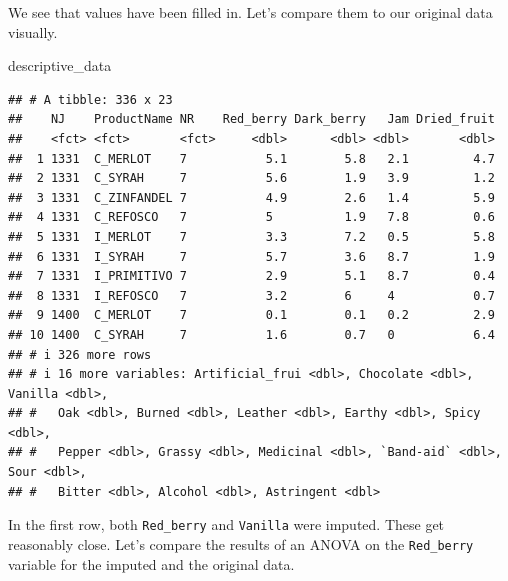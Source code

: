\documentclass[
]{book}
\newenvironment{Shaded}{\begin{snugshade}}{\end{snugshade}}
\newcommand{\AttributeTok}[1]{\textcolor[rgb]{0.13,0.29,0.53}{#1}}
\newcommand{\CommentTok}[1]{\textcolor[rgb]{0.56,0.35,0.01}{\textit{#1}}}
\newcommand{\DecValTok}[1]{\textcolor[rgb]{0.00,0.00,0.81}{#1}}
\newcommand{\FunctionTok}[1]{\textcolor[rgb]{0.13,0.29,0.53}{\textbf{#1}}}
\newcommand{\NormalTok}[1]{#1}
\newcommand{\SpecialCharTok}[1]{\textcolor[rgb]{0.81,0.36,0.00}{\textbf{#1}}}
\begin{document}
We see that values have been filled in. Let's compare them to our original data visually.

\begin{Shaded}
\begin{Highlighting}[]
\NormalTok{descriptive\_data}
\end{Highlighting}
\end{Shaded}

\begin{verbatim}
## # A tibble: 336 x 23
##    NJ    ProductName NR    Red_berry Dark_berry   Jam Dried_fruit
##    <fct> <fct>       <fct>     <dbl>      <dbl> <dbl>       <dbl>
##  1 1331  C_MERLOT    7           5.1        5.8   2.1         4.7
##  2 1331  C_SYRAH     7           5.6        1.9   3.9         1.2
##  3 1331  C_ZINFANDEL 7           4.9        2.6   1.4         5.9
##  4 1331  C_REFOSCO   7           5          1.9   7.8         0.6
##  5 1331  I_MERLOT    7           3.3        7.2   0.5         5.8
##  6 1331  I_SYRAH     7           5.7        3.6   8.7         1.9
##  7 1331  I_PRIMITIVO 7           2.9        5.1   8.7         0.4
##  8 1331  I_REFOSCO   7           3.2        6     4           0.7
##  9 1400  C_MERLOT    7           0.1        0.1   0.2         2.9
## 10 1400  C_SYRAH     7           1.6        0.7   0           6.4
## # i 326 more rows
## # i 16 more variables: Artificial_frui <dbl>, Chocolate <dbl>, Vanilla <dbl>,
## #   Oak <dbl>, Burned <dbl>, Leather <dbl>, Earthy <dbl>, Spicy <dbl>,
## #   Pepper <dbl>, Grassy <dbl>, Medicinal <dbl>, `Band-aid` <dbl>, Sour <dbl>,
## #   Bitter <dbl>, Alcohol <dbl>, Astringent <dbl>
\end{verbatim}

In the first row, both \texttt{Red\_berry} and \texttt{Vanilla} were imputed. These get reasonably close. Let's compare the results of an ANOVA on the \texttt{Red\_berry} variable for the imputed and the original data.

\begin{Shaded}
\end{Shaded}
\end{document}
